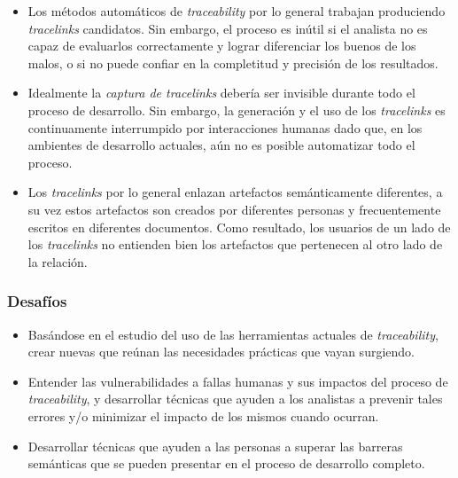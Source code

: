 \documentclass[a4paper,12pt,oneside,spanish]{book}
\begin{document}
\begin{itemize}[label={$\times$}]

\item Los métodos automáticos de \textit{traceability} por lo general trabajan produciendo \textit{tracelinks} candidatos. Sin embargo, el proceso es inútil si el analista no es capaz de evaluarlos correctamente y lograr diferenciar los buenos de los malos, o si no puede confiar en la completitud y precisión de los resultados.

\item Idealmente la \textit{captura de tracelinks} debería ser invisible durante todo el proceso de desarrollo. Sin embargo, la generación y el uso de los \textit{tracelinks} es continuamente interrumpido por interacciones humanas dado que, en los ambientes de desarrollo actuales, aún no es posible automatizar todo el proceso.

\item Los \textit{tracelinks} por lo general enlazan artefactos semánticamente diferentes, a su vez estos artefactos son creados por diferentes personas y frecuentemente escritos en diferentes documentos. Como resultado, los usuarios de un lado de los \textit{tracelinks} no entienden bien los artefactos que pertenecen al otro lado de la relación.

\end{itemize}

\subsubsection{Desafíos}

\begin{itemize}[label={\checkmark}]

\item Basándose en el estudio del uso de las herramientas actuales de \textit{traceability}, crear nuevas que reúnan las necesidades prácticas que vayan surgiendo.

\item Entender las vulnerabilidades a fallas humanas y sus impactos del proceso de \textit{traceability}, y desarrollar técnicas que ayuden a los analistas a prevenir tales errores y/o minimizar el impacto de los mismos cuando ocurran.

\item Desarrollar técnicas que ayuden a las personas a superar las barreras semánticas que se pueden presentar en el proceso de desarrollo completo.

\end{itemize}
\end{document}
